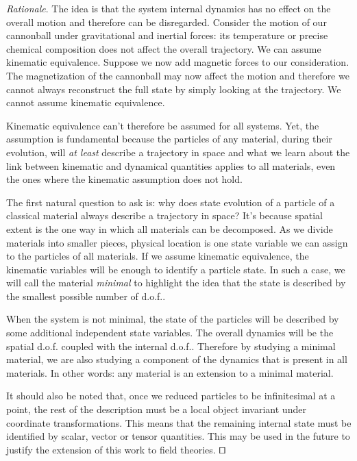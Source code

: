\documentclass[smallextended]{svjour3}
\numberwithin{equation}{section}
\newenvironment{rationale}{\emph{Rationale}.}{\hfill\(\qed\)}
\theoremstyle{definition}
\newenvironment{rationale}{\emph{Rationale}.}{\qed}
\begin{document}
\begin{rationale}
	The idea is that the system internal dynamics has no effect on the overall motion and therefore can be disregarded. Consider the motion of our cannonball under gravitational and inertial forces: its temperature or precise chemical composition does not affect the overall trajectory. We can assume kinematic equivalence. Suppose we now add magnetic forces to our consideration. The magnetization of the cannonball may now affect the motion and therefore we cannot always reconstruct the full state by simply looking at the trajectory. We cannot assume kinematic equivalence.
	
	Kinematic equivalence can't therefore be assumed for all systems. Yet, the assumption is fundamental because the particles of any material, during their evolution, will \emph{at least} describe a trajectory in space and what we learn about the link between kinematic and dynamical quantities applies to all materials, even the ones where the kinematic assumption does not hold.
	
	The first natural question to ask is: why does state evolution of a particle of a classical material always describe a trajectory in space? It's because spatial extent is the one way in which all materials can be decomposed. As we divide materials into smaller pieces, physical location is one state variable we can assign to the particles of all materials. If we assume kinematic equivalence, the kinematic variables will be enough to identify a particle state. In such a case, we will call the material \emph{minimal} to highlight the idea that the state is described by the smallest possible number of d.o.f..
	
	When the system is not minimal, the state of the particles will be described by some additional independent state variables. The overall dynamics will be the spatial d.o.f. coupled with the internal d.o.f.. Therefore by studying a minimal material, we are also studying a component of the dynamics that is present in all materials. In other words: any material is an extension to a minimal material.
	
	It should also be noted that, once we reduced particles to be infinitesimal at a point, the rest of the description must be a local object invariant under coordinate transformations. This means that the remaining internal state must be identified by scalar, vector or tensor quantities. This may be used in the future to justify the extension of this work to field theories. 
\end{rationale}
\end{document}
